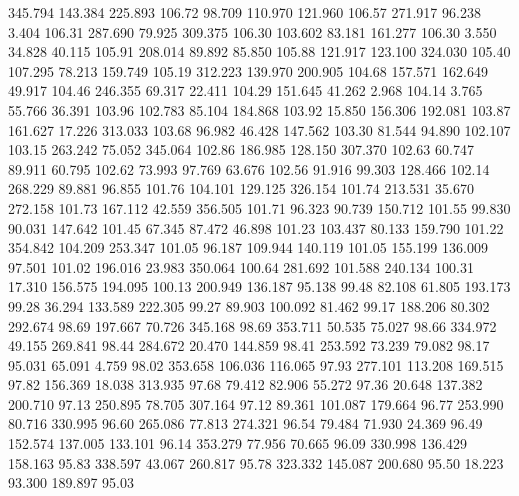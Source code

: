  345.794  143.384  225.893       106.72
  98.709  110.970  121.960       106.57
 271.917   96.238    3.404       106.31
 287.690   79.925  309.375       106.30
 103.602   83.181  161.277       106.30
   3.550   34.828   40.115       105.91
 208.014   89.892   85.850       105.88
 121.917  123.100  324.030       105.40
 107.295   78.213  159.749       105.19
 312.223  139.970  200.905       104.68
 157.571  162.649   49.917       104.46
 246.355   69.317   22.411       104.29
 151.645   41.262    2.968       104.14
   3.765   55.766   36.391       103.96
 102.783   85.104  184.868       103.92
  15.850  156.306  192.081       103.87
 161.627   17.226  313.033       103.68
  96.982   46.428  147.562       103.30
  81.544   94.890  102.107       103.15
 263.242   75.052  345.064       102.86
 186.985  128.150  307.370       102.63
  60.747   89.911   60.795       102.62
  73.993   97.769   63.676       102.56
  91.916   99.303  128.466       102.14
 268.229   89.881   96.855       101.76
 104.101  129.125  326.154       101.74
 213.531   35.670  272.158       101.73
 167.112   42.559  356.505       101.71
  96.323   90.739  150.712       101.55
  99.830   90.031  147.642       101.45
  67.345   87.472   46.898       101.23
 103.437   80.133  159.790       101.22
 354.842  104.209  253.347       101.05
  96.187  109.944  140.119       101.05
 155.199  136.009   97.501       101.02
 196.016   23.983  350.064       100.64
 281.692  101.588  240.134       100.31
  17.310  156.575  194.095       100.13
 200.949  136.187   95.138        99.48
  82.108   61.805  193.173        99.28
  36.294  133.589  222.305        99.27
  89.903  100.092   81.462        99.17
 188.206   80.302  292.674        98.69
 197.667   70.726  345.168        98.69
 353.711   50.535   75.027        98.66
 334.972   49.155  269.841        98.44
 284.672   20.470  144.859        98.41
 253.592   73.239   79.082        98.17
  95.031   65.091    4.759        98.02
 353.658  106.036  116.065        97.93
 277.101  113.208  169.515        97.82
 156.369   18.038  313.935        97.68
  79.412   82.906   55.272        97.36
  20.648  137.382  200.710        97.13
 250.895   78.705  307.164        97.12
  89.361  101.087  179.664        96.77
 253.990   80.716  330.995        96.60
 265.086   77.813  274.321        96.54
  79.484   71.930   24.369        96.49
 152.574  137.005  133.101        96.14
 353.279   77.956   70.665        96.09
 330.998  136.429  158.163        95.83
 338.597   43.067  260.817        95.78
 323.332  145.087  200.680        95.50
  18.223   93.300  189.897        95.03
